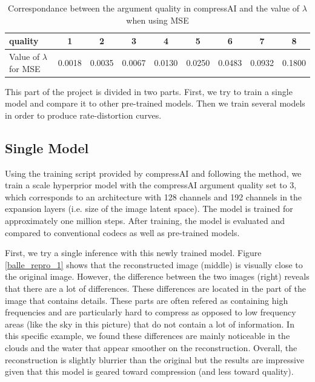 \begin{table}[]
    \centering
    \begin{tabular}{|l|c|c|c|c|c|c|c|c|}
    \hline
    \textsf{quality}                      & 1 & 2 & 3 & 4 & 5 & 6 & 7 & 8 \\ \hline
    Value of \(\lambda\) for MSE & 0.0018 & 0.0035 & 0.0067 & 0.0130 & 0.0250 & 0.0483 & 0.0932 & 0.1800 \\ \hline
    \end{tabular}
    \caption{Correspondance between the argument \textsf{quality} in compressAI and the value of \(\lambda\) when using MSE}
    \label{tab_quality_lambda}
\end{table}

This part of the project is divided in two parts. First, we try to train a single model and compare it to other pre-trained models. Then we train several models in order to produce rate-distortion curves.

\subsection{Single Model}
Using the training script provided by compressAI and following the method, we train a scale hyperprior model with the compressAI argument \textsf{quality} set to 3, which corresponds to an architecture with 128 channels and 192 channels in the expansion layers (i.e. size of the image latent space). The model is trained for approximately one million steps. 
After training, the model is evaluated and compared to conventional codecs as well as pre-trained models.

First, we try a single inference with this newly trained model. Figure \ref{balle_repro_1} shows that the reconstructed image (middle) is visually close to the original image. However, the difference between the two images (right) reveals that there are a lot of differences. These differences are located in the part of the image that contains details. These parts are often refered as containing high frequencies and are particularly hard to compress as opposed to low frequency areas (like the sky in this picture) that do not contain a lot of information. In this specific example, we found these differences are mainly noticeable in the clouds and the water that appear smoother on the reconstruction. Overall, the reconstruction is slightly blurrier than the original but the results are impressive given that this model is geared toward compression (and less toward quality).

